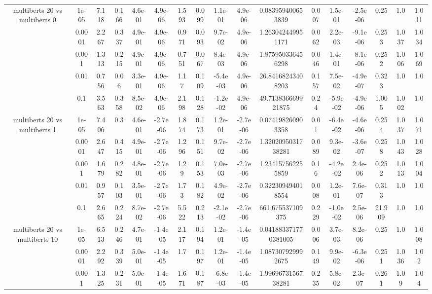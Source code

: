 \begin{tabular}{|c|c|c|c|c|c|c|c|c|c|c|c|c|c|c|c|c|}
\hline
\multirow{5}{*}{multiberts 20 vs multiberts 0} & 1e-05 & 7.118 & 0.166 & 4.6e-01 & 4.9e-06 & 1.593 & 0.099 & 1.1e-01 & 4.9e-06 & 0.083959400653839 & 0.007 & 1.5e-01 & -2.5e-06 & 0.25 & 1.0 & 1.011 \\
 & 0.0001 & 2.267 & 0.337 & 4.9e-01 & 4.9e-06 & 0.971 & 0.093 & 9.7e-02 & 4.9e-06 & 1.263042449951171 & 0.062 & 2.2e-03 & -9.1e-06 & 0.253 & 1.037 & 1.034 \\
 & 0.001 & 1.313 & 0.215 & 4.9e-01 & 4.9e-06 & 0.751 & 0.067 & 8.4e-03 & 4.9e-06 & 1.875950336456298 & 0.046 & 1.4e-01 & -8.1e-06 & 0.252 & 1.006 & 1.069 \\
 & 0.01 & 0.756 & 0.06 & 3.3e-01 & 4.9e-06 & 1.17 & 0.109 & -5.4e-03 & 4.9e-06 & 26.84168243408203 & 0.157 & 7.5e-02 & -4.9e-07 & 0.323 & 1.0 & 1.0 \\
 & 0.1 & 3.563 & 0.358 & 8.5e-02 & 4.9e-06 & 2.198 & 0.128 & -1.2e-02 & 4.9e-06 & 49.713836669921875 & 0.24 & -5.9e-02 & -4.9e-06 & 1.005 & 1.002 & 1.0 \\
\hline
\multirow{5}{*}{multiberts 20 vs multiberts 1} & 1e-05 & 7.406 & 0.3 & 4.6e-01 & -2.7e-06 & 1.874 & 0.173 & 1.2e-01 & -2.7e-06 & 0.074198260903358 & 0.01 & -6.4e-02 & -4.6e-06 & 0.254 & 1.037 & 1.071 \\
 & 0.0001 & 2.647 & 0.415 & 4.9e-01 & -2.7e-06 & 1.296 & 0.151 & 9.7e-02 & -2.7e-06 & 1.3202095031738281 & 0.089 & 9.3e-02 & -3.6e-07 & 0.258 & 1.043 & 1.028 \\
 & 0.001 & 1.679 & 0.282 & 4.8e-01 & -2.7e-06 & 1.29 & 0.153 & 7.0e-03 & -2.7e-06 & 1.234157562255859 & 0.16 & -4.2e-02 & 2.4e-06 & 0.252 & 1.013 & 1.004 \\
 & 0.01 & 0.957 & 0.103 & 3.5e-01 & -2.7e-06 & 1.73 & 0.182 & 4.9e-02 & -2.7e-06 & 0.322309494018554 & 0.008 & 1.2e-01 & 7.6e-07 & 0.313 & 1.0 & 1.0 \\
 & 0.1 & 2.665 & 0.224 & 8.7e-02 & -2.7e-06 & 5.522 & 0.213 & -2.1e-02 & -2.7e-06 & 661.675537109375 & 0.229 & -1.0e-02 & 2.5e-06 & 21.909 & 1.0 & 1.0 \\
\hline
\multirow{5}{*}{multiberts 20 vs multiberts 10} & 1e-05 & 6.513 & 0.246 & 4.7e-01 & -1.4e-05 & 2.117 & 0.194 & 1.2e-01 & -1.4e-05 & 0.041883371770381005 & 0.006 & 3.7e-03 & 8.2e-06 & 0.25 & 1.0 & 1.008 \\
 & 0.0001 & 2.292 & 0.339 & 5.0e-01 & -1.4e-05 & 1.7 & 0.197 & 1.2e-01 & -1.4e-05 & 1.087307929992675 & 0.149 & 9.9e-02 & -6.3e-06 & 0.251 & 1.036 & 1.02 \\
 & 0.001 & 1.325 & 0.231 & 5.0e-01 & -1.4e-05 & 1.671 & 0.187 & -6.8e-03 & -1.4e-05 & 1.9969673156738281 & 0.235 & 5.8e-02 & 2.3e-07 & 0.261 & 1.09 & 1.04 \\

\end{tabular}
